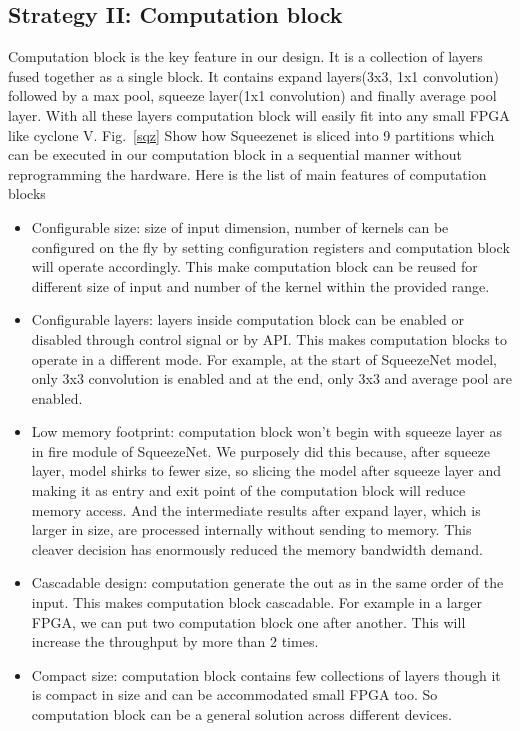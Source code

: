 \documentclass[conference]{IEEEtran}
\begin{document}
\subsection{Strategy II: Computation block}
Computation block is the key feature in our design. It is a collection of layers fused together as a single block. It contains expand layers(3x3, 1x1 convolution) followed by a max pool, squeeze layer(1x1 convolution) and finally average pool layer. With all these layers computation block will easily fit into any small FPGA like cyclone V. Fig.~\ref{sqz} Show how Squeezenet is sliced into 9 partitions which can be executed in our computation block in a sequential manner without reprogramming the hardware. Here is the list of main features of computation blocks

\begin{itemize}
\item Configurable size: size of input dimension, number of kernels can be configured on the fly by setting configuration registers and computation block will operate accordingly. This make computation block can be reused for different size of input and number of the kernel within the provided range.

\item Configurable layers: layers inside computation block can be enabled or disabled through control signal or by API. This makes computation blocks to operate in a different mode. For example, at the start of SqueezeNet model, only 3x3 convolution is enabled and at the end, only 3x3 and average pool are enabled.

\item Low memory footprint: computation block won't begin with squeeze layer as in fire module of SqueezeNet. We purposely did this because, after squeeze layer, model shirks to fewer size, so slicing the model after squeeze layer and making it as entry and exit point of the computation block will reduce memory access. And the intermediate results after expand layer, which is larger in size, are processed internally without sending to memory. This cleaver decision has enormously reduced the memory bandwidth demand. 


\item Cascadable design: computation generate the out as in the same order of the input. This makes computation block cascadable. For example in a larger FPGA, we can put two computation block one after another. This will increase the throughput by more than 2 times.

\item Compact size: computation block contains few collections of layers though it is compact in size and can be accommodated small FPGA too. So computation block can be a general solution across different devices.

\end{itemize}
\end{document}
